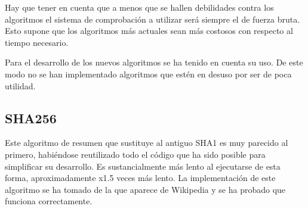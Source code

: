 Hay que tener en cuenta que a menos que se hallen debilidades contra los algoritmos el sistema de comprobación a utilizar será siempre el de fuerza bruta. Esto supone que los algoritmos más actuales sean más costosos con respecto al tiempo necesario.

Para el desarrollo de los nuevos algoritmos se ha tenido en cuenta su uso. De este modo no se han implementado algoritmos que estén en desuso por ser de poca utilidad.

\subsection{SHA256}

Este algoritmo de resumen que sustituye al antiguo SHA1 es muy parecido al primero, habiéndose reutilizado todo el código que ha sido posible para simplificar su desarrollo. Es sustancialmente más lento al ejecutarse de esta forma, aproximadamente x1.5 veces más lento.
La implementación de este algoritmo se ha tomado de la que aparece de Wikipedia y se ha probado que funciona correctamente.
